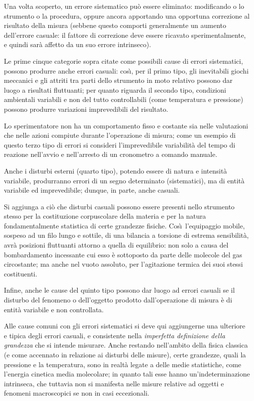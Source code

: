 Una volta scoperto, un errore sistematico pu\`o essere
eliminato: modificando o lo strumento o la procedura, oppure
ancora apportando una opportuna correzione al risultato
della misura (sebbene questo comporti generalmente un
aumento dell'errore casuale: il fattore di correzione deve
essere ricavato sperimentalmente, e quindi sar\`a
affetto da un suo errore intrinseco).%

%
Le prime cinque categorie sopra citate come possibili cause
di errori sistematici, possono produrre anche errori
casuali: cos\`\i, per il primo tipo, gli inevitabili giochi
meccanici e gli attriti tra parti dello strumento in moto
relativo possono dar luogo a risultati fluttuanti; per
quanto riguarda il secondo tipo, condizioni ambientali
variabili e non del tutto controllabili (come temperatura e
pressione) possono produrre variazioni imprevedibili del
risultato.

Lo sperimentatore non ha un comportamento fisso e costante
sia nelle valutazioni che nelle azioni compiute durante
l'operazione di misura; come un esempio di questo terzo tipo
di errori si consideri l'imprevedibile variabilit\`a del
tempo di reazione nell'avvio e nell'arresto di un cronometro
a comando manuale.

Anche i disturbi esterni (quarto tipo), potendo essere di
natura e intensit\`a variabile, produrranno errori di un
segno determinato (sistematici), ma di entit\`a variabile ed
imprevedibile; dunque, in parte, anche casuali.

Si aggiunga a ci\`o che disturbi casuali possono essere
presenti nello strumento stesso per la costituzione
corpuscolare della materia e per la natura fondamentalmente
statistica di certe grandezze fisiche.  Cos\`\i\
l'equipaggio mobile, sospeso ad un filo lungo e sottile, di
una bilancia a torsione di estrema sensibilit\`a, avr\`a
posizioni fluttuanti attorno a quella di equilibrio: non
solo a causa del bombardamento incessante cui esso \`e
sottoposto da parte delle molecole del gas circostante; ma
anche nel vuoto assoluto, per l'agitazione termica dei suoi
stessi costituenti.

Infine, anche le cause del quinto tipo possono dar luogo ad
errori casuali se il disturbo del fenomeno o dell'oggetto
prodotto dall'operazione di misura \`e di entit\`a variabile
e non controllata.

Alle cause comuni con gli errori sistematici si deve qui
aggiungerne una ulteriore e tipica degli errori casuali, e
consistente nella \emph{imperfetta definizione della
  grandezza} che si intende misurare.  Anche restando
nell'ambito della fisica classica (e come accennato in
relazione ai disturbi delle misure), certe grandezze, quali
la pressione e la temperatura, sono in realt\`a legate a
delle medie statistiche, come l'energia cinetica media
molecolare; in quanto tali esse hanno un'indeterminazione
intrinseca, che tuttavia non si manifesta nelle misure
relative ad oggetti e fenomeni macroscopici se non in casi
eccezionali.

